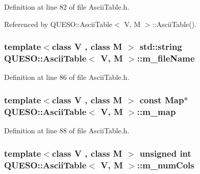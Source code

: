 Definition at line 82 of file Ascii\-Table.\-h.



Referenced by Q\-U\-E\-S\-O\-::\-Ascii\-Table$<$ V, M $>$\-::\-Ascii\-Table().

\hypertarget{class_q_u_e_s_o_1_1_ascii_table_adb7e4bac907ef1c93d745f02ea9f15d2}{
\subsubsection[{m\-\_\-file\-Name}]{\setlength{\rightskip}{0pt plus 5cm}template$<$class V , class M $>$ std\-::string {\bf Q\-U\-E\-S\-O\-::\-Ascii\-Table}$<$ V, M $>$\-::m\-\_\-file\-Name\hspace{0.3cm}{\ttfamily [private]}}}\label{class_q_u_e_s_o_1_1_ascii_table_adb7e4bac907ef1c93d745f02ea9f15d2}


Definition at line 86 of file Ascii\-Table.\-h.

\hypertarget{class_q_u_e_s_o_1_1_ascii_table_a7771fe0a08a93abdeadcc5e55e350eea}{
\subsubsection[{m\-\_\-map}]{\setlength{\rightskip}{0pt plus 5cm}template$<$class V , class M $>$ const {\bf Map}$\ast$ {\bf Q\-U\-E\-S\-O\-::\-Ascii\-Table}$<$ V, M $>$\-::m\-\_\-map\hspace{0.3cm}{\ttfamily [private]}}}\label{class_q_u_e_s_o_1_1_ascii_table_a7771fe0a08a93abdeadcc5e55e350eea}


Definition at line 88 of file Ascii\-Table.\-h.

\hypertarget{class_q_u_e_s_o_1_1_ascii_table_ada886c8db06d2d618f2898ad2cf2bd87}{
\subsubsection[{m\-\_\-num\-Cols}]{\setlength{\rightskip}{0pt plus 5cm}template$<$class V , class M $>$ unsigned int {\bf Q\-U\-E\-S\-O\-::\-Ascii\-Table}$<$ V, M $>$\-::m\-\_\-num\-Cols\hspace{0.3cm}{\ttfamily [private]}}}\label{class_q_u_e_s_o_1_1_ascii_table_ada886c8db06d2d618f2898ad2cf2bd87}


